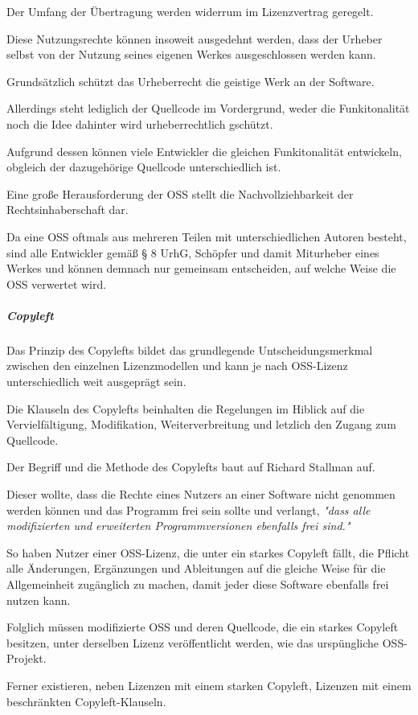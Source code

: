 Der Umfang der Übertragung werden widerrum im Lizenzvertrag geregelt.  

Diese Nutzungsrechte können insoweit ausgedehnt werden, dass der Urheber selbst von der Nutzung seines eigenen Werkes ausgeschlossen werden kann. 

Grundsätzlich schützt das Urheberrecht die geistige Werk an der Software. 

Allerdings steht lediglich der Quellcode im Vordergrund, weder die Funkitonalität noch die Idee dahinter wird urheberrechtlich gschützt. 

Aufgrund dessen können viele Entwickler die gleichen Funkitonalität entwickeln, obgleich der dazugehörige Quellcode unterschiedlich ist. 

Eine große Herausforderung der OSS stellt die Nachvollziehbarkeit der Rechtsinhaberschaft dar. 

Da eine OSS oftmals aus mehreren Teilen mit unterschiedlichen Autoren besteht, sind alle Entwickler gemäß § 8 UrhG, Schöpfer und damit Miturheber eines Werkes und können demnach nur gemeinsam entscheiden, auf welche Weise die OSS verwertet wird. 

\subparagraph{Copyleft}
Das Prinzip des Copylefts bildet das grundlegende Untscheidungsmerkmal zwischen den einzelnen Lizenzmodellen und kann je nach OSS-Lizenz unterschiedlich weit ausgeprägt sein. 

Die Klauseln des Copylefts beinhalten die Regelungen im Hiblick auf die Vervielfältigung, Modifikation, Weiterverbreitung und letzlich den Zugang zum Quellcode.

Der Begriff und die Methode des Copylefts baut auf Richard Stallman auf. 

Dieser wollte, dass die Rechte eines Nutzers an einer Software nicht genommen werden können und das Programm frei sein sollte und verlangt, \textit{"dass alle modifizierten und erweiterten Programmversionen ebenfalls frei sind."}

So haben Nutzer einer OSS-Lizenz, die unter ein starkes Copyleft fällt, die Pflicht alle Änderungen, Ergänzungen und Ableitungen auf die gleiche Weise für die Allgemeinheit zugänglich zu machen, damit jeder diese Software ebenfalls frei nutzen kann. 

Folglich müssen modifizierte OSS und deren Quellcode, die ein starkes Copyleft besitzen, unter derselben Lizenz veröffentlicht werden, wie das urspüngliche OSS-Projekt.

Ferner existieren, neben Lizenzen mit einem starken Copyleft, Lizenzen mit einem beschränkten Copyleft-Klauseln.

